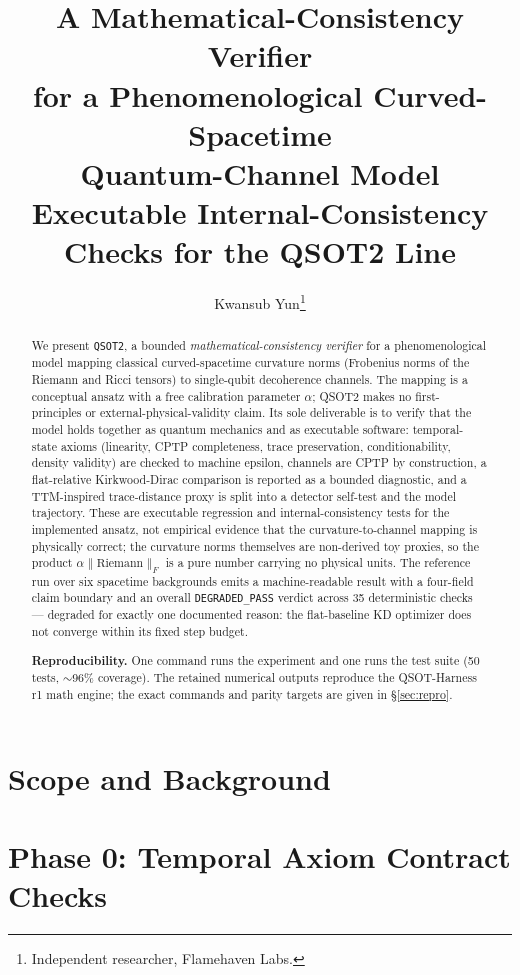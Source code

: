 \documentclass[11pt,a4paper]{article}
\title{%
  A Mathematical-Consistency Verifier\\
  for a Phenomenological Curved-Spacetime\\
  Quantum-Channel Model\\[0.5em]
  \large Executable Internal-Consistency Checks for the QSOT2 Line
}
\author{Kwansub Yun\thanks{Independent researcher, Flamehaven Labs.}}
\date{}
\begin{document}
\maketitle

\begin{abstract}
We present \texttt{QSOT2}, a bounded \emph{mathematical-consistency verifier} for a
phenomenological model mapping classical curved-spacetime curvature norms (Frobenius
norms of the Riemann and Ricci tensors) to single-qubit decoherence channels. The
mapping is a conceptual ansatz with a free calibration parameter $\alpha$; QSOT2 makes
no first-principles or external-physical-validity claim. Its sole deliverable is to
verify that the model holds together as quantum mechanics and as executable software:
temporal-state axioms (linearity, CPTP completeness, trace preservation,
conditionability, density validity) are checked to machine epsilon, channels are CPTP by
construction, a flat-relative Kirkwood-Dirac comparison is reported as a bounded
diagnostic, and a TTM-inspired trace-distance proxy is split into a detector self-test
and the model trajectory. These are executable regression and internal-consistency
tests for the implemented ansatz, not empirical evidence that the curvature-to-channel
mapping is physically correct; the curvature norms themselves are non-derived toy
proxies, so the product $\alpha\lVert\mathrm{Riemann}\rVert_F$ is a pure number carrying
no physical units. The reference run over six spacetime backgrounds emits a
machine-readable result with a four-field claim boundary and an overall
\texttt{DEGRADED\_PASS} verdict across 35 deterministic checks --- degraded for exactly
one documented reason: the flat-baseline KD optimizer does not converge within its fixed
step budget.

\noindent\textbf{Reproducibility.} One command runs the experiment and one runs the test
suite (50 tests, $\sim$96\% coverage). The retained numerical outputs reproduce the
QSOT-Harness r1 math engine; the exact commands and parity targets are given in
\S\ref{sec:repro}.
\end{abstract}

\clearpage
\tableofcontents
\clearpage

\section{Scope and Background}
\label{sec:scope}


\section{Phase 0: Temporal Axiom Contract Checks}
\label{sec:phase0}

\end{document}
